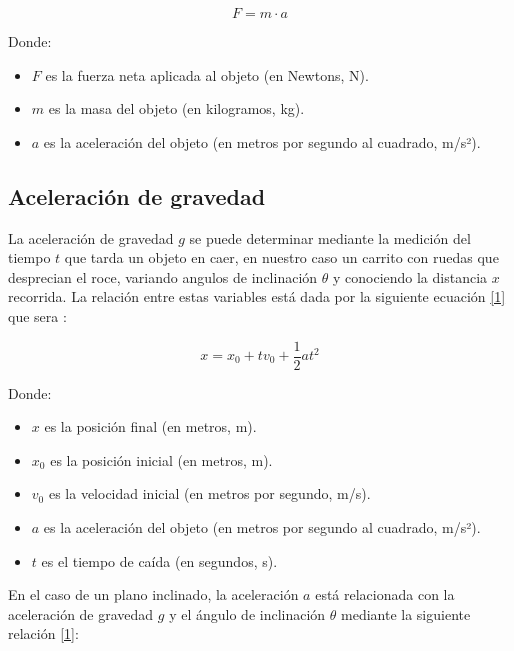 \documentclass{article}
\begin{document}
\begin{multicols}{2}
            \begin{equation}
                F = m \cdot a
            \end{equation}

        Donde:
            \begin{itemize}
                \item $F$ es la fuerza neta aplicada al objeto (en Newtons, N).
                \item $m$ es la masa del objeto (en kilogramos, kg).
                \item $a$ es la aceleración del objeto (en metros por segundo al cuadrado, m/s²).
            \end{itemize}

    \subsection{Aceleración de gravedad}

        La aceleración de gravedad $g$ se puede determinar mediante la medición del tiempo $t$ que tarda 
        un objeto en caer, en nuestro caso un carrito con ruedas que desprecian el roce, variando angulos
        de inclinación $\theta$ y conociendo la distancia $x$ recorrida. La relación entre estas variables
        está dada por la siguiente ecuación \ref{1} que sera  :

            \begin{equation}
                x = x_0 + tv_0 + \frac{1}{2} a t^2
            \end{equation}

        Donde:

            \begin{itemize}
                \item $x$ es la posición final (en metros, m).
                \item $x_0$ es la posición inicial (en metros, m).
                \item $v_0$ es la velocidad inicial (en metros por segundo, m/s).
                \item $a$ es la aceleración del objeto (en metros por segundo al cuadrado, m/s²).
                \item $t$ es el tiempo de caída (en segundos, s).
            \end{itemize}

        En el caso de un plano inclinado, la aceleración $a$ está relacionada con la aceleración de 
        gravedad $g$ y el ángulo de inclinación $\theta$ mediante la siguiente relación \ref{1}:


\end{multicols}
\end{document}
